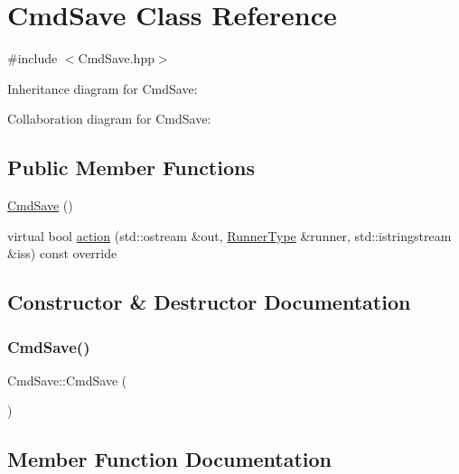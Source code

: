 \hypertarget{classCmdSave}{}\section{Cmd\+Save Class Reference}
\label{classCmdSave}


{\ttfamily \#include $<$Cmd\+Save.\+hpp$>$}



Inheritance diagram for Cmd\+Save\+:


Collaboration diagram for Cmd\+Save\+:
\subsection*{Public Member Functions}
\begin{DoxyCompactItemize}
\item 
\hyperlink{classCmdSave_a43da9362bbde62dc222f3fb0ba6f2b29}{Cmd\+Save} ()
\item 
virtual bool \hyperlink{classCmdSave_a44fb7fe716f0d65f597e7eccb647ba3d}{action} (std\+::ostream \&out, \hyperlink{Command_8hpp_ad45c3de597c2023a8be0399d914161f4}{Runner\+Type} \&runner, std\+::istringstream \&iss) const override
\end{DoxyCompactItemize}


\subsection{Constructor \& Destructor Documentation}
\mbox{\label{classCmdSave_a43da9362bbde62dc222f3fb0ba6f2b29}} 
\subsubsection{\texorpdfstring{Cmd\+Save()}{CmdSave()}}
{\footnotesize\ttfamily Cmd\+Save\+::\+Cmd\+Save (\begin{DoxyParamCaption}{ }\end{DoxyParamCaption})}



\subsection{Member Function Documentation}
\mbox{\label{classCmdSave_a44fb7fe716f0d65f597e7eccb647ba3d}} 
